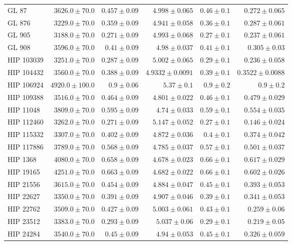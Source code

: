 \begin{longtable*}{lrrrrr}
GL 87 & $3626.0\pm 70.0$ & $0.457\pm 0.09$ & $4.998\pm 0.065$ & $0.46\pm 0.1$ & $0.272\pm 0.065$ \\ 
GL 876 & $3229.0\pm 70.0$ & $0.359\pm 0.09$ & $4.941\pm 0.058$ & $0.36\pm 0.1$ & $0.287\pm 0.061$ \\ 
GL 905 & $3188.0\pm 70.0$ & $0.271\pm 0.09$ & $4.993\pm 0.068$ & $0.27\pm 0.1$ & $0.237\pm 0.061$ \\ 
GL 908 & $3596.0\pm 70.0$ & $0.41\pm 0.09$ & $4.98\pm 0.037$ & $0.41\pm 0.1$ & $0.305\pm 0.03$ \\ 
HIP 103039 & $3251.0\pm 70.0$ & $0.287\pm 0.09$ & $5.002\pm 0.065$ & $0.29\pm 0.1$ & $0.236\pm 0.058$ \\ 
HIP 104432 & $3560.0\pm 70.0$ & $0.388\pm 0.09$ & $4.9332\pm 0.0091$ & $0.39\pm 0.1$ & $0.3522\pm 0.0088$ \\ 
HIP 106924 & $4920.0\pm 100.0$ & $0.9\pm 0.06$ & $5.37\pm 0.1$ & $0.9\pm 0.2$ & $0.9\pm 0.2$ \\ 
HIP 109388 & $3516.0\pm 70.0$ & $0.464\pm 0.09$ & $4.801\pm 0.022$ & $0.46\pm 0.1$ & $0.479\pm 0.029$ \\ 
HIP 11048 & $3809.0\pm 70.0$ & $0.595\pm 0.09$ & $4.74\pm 0.033$ & $0.59\pm 0.1$ & $0.554\pm 0.035$ \\ 
HIP 112460 & $3262.0\pm 70.0$ & $0.271\pm 0.09$ & $5.147\pm 0.052$ & $0.27\pm 0.1$ & $0.146\pm 0.024$ \\ 
HIP 115332 & $3307.0\pm 70.0$ & $0.402\pm 0.09$ & $4.872\pm 0.036$ & $0.4\pm 0.1$ & $0.374\pm 0.042$ \\ 
HIP 117886 & $3789.0\pm 70.0$ & $0.568\pm 0.09$ & $4.785\pm 0.037$ & $0.57\pm 0.1$ & $0.501\pm 0.037$ \\ 
HIP 1368 & $4080.0\pm 70.0$ & $0.658\pm 0.09$ & $4.678\pm 0.023$ & $0.66\pm 0.1$ & $0.617\pm 0.029$ \\ 
HIP 19165 & $4251.0\pm 70.0$ & $0.663\pm 0.09$ & $4.682\pm 0.022$ & $0.66\pm 0.1$ & $0.602\pm 0.026$ \\ 
HIP 21556 & $3615.0\pm 70.0$ & $0.454\pm 0.09$ & $4.884\pm 0.047$ & $0.45\pm 0.1$ & $0.393\pm 0.053$ \\ 
HIP 22627 & $3350.0\pm 70.0$ & $0.391\pm 0.09$ & $4.907\pm 0.046$ & $0.39\pm 0.1$ & $0.341\pm 0.053$ \\ 
HIP 22762 & $3509.0\pm 70.0$ & $0.427\pm 0.09$ & $5.003\pm 0.061$ & $0.43\pm 0.1$ & $0.259\pm 0.06$ \\ 
HIP 23512 & $3383.0\pm 70.0$ & $0.293\pm 0.09$ & $5.037\pm 0.06$ & $0.29\pm 0.1$ & $0.219\pm 0.05$ \\ 
HIP 24284 & $3540.0\pm 70.0$ & $0.45\pm 0.09$ & $4.94\pm 0.053$ & $0.45\pm 0.1$ & $0.326\pm 0.059$ \\ 

\end{longtable*}

